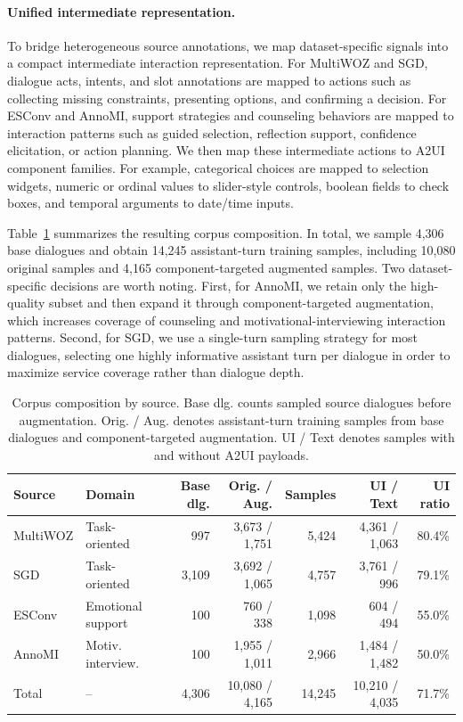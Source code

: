 \paragraph{Unified intermediate representation.}
To bridge heterogeneous source annotations, we map dataset-specific signals into a compact intermediate interaction representation. For MultiWOZ and SGD, dialogue acts, intents, and slot annotations are mapped to actions such as collecting missing constraints, presenting options, and confirming a decision. For ESConv and AnnoMI, support strategies and counseling behaviors are mapped to interaction patterns such as guided selection, reflection support, confidence elicitation, or action planning. We then map these intermediate actions to A2UI component families. For example, categorical choices are mapped to selection widgets, numeric or ordinal values to slider-style controls, boolean fields to check boxes, and temporal arguments to date/time inputs.

Table~\ref{tab:corpus_composition} summarizes the resulting corpus composition. In total,
we sample 4,306 base dialogues and obtain 14,245 assistant-turn training samples, including
10,080 original samples and 4,165 component-targeted augmented samples. Two dataset-specific
decisions are worth noting. First, for AnnoMI, we retain only the high-quality subset and then
expand it through component-targeted augmentation, which increases coverage of counseling
and motivational-interviewing interaction patterns. Second, for SGD, we use a single-turn
sampling strategy for most dialogues, selecting one highly informative assistant turn per
dialogue in order to maximize service coverage rather than dialogue depth.

\begin{table}[t]
\centering
\small
\setlength{\tabcolsep}{4pt}
\begin{tabular}{llrrrrr}
\toprule
Source & Domain & Base dlg. & Orig. / Aug. & Samples & UI / Text & UI ratio \\
\midrule
MultiWOZ & Task-oriented & 997 & 3,673 / 1,751 & 5,424 & 4,361 / 1,063 & 80.4\% \\
SGD & Task-oriented & 3,109 & 3,692 / 1,065 & 4,757 & 3,761 / 996 & 79.1\% \\
ESConv & Emotional support & 100 & 760 / 338 & 1,098 & 604 / 494 & 55.0\% \\
AnnoMI & Motiv. interview. & 100 & 1,955 / 1,011 & 2,966 & 1,484 / 1,482 & 50.0\% \\
\midrule
Total & -- & 4,306 & 10,080 / 4,165 & 14,245 & 10,210 / 4,035 & 71.7\% \\
\bottomrule
\end{tabular}
\caption{
Corpus composition by source. Base dlg. counts sampled source dialogues before augmentation.
Orig. / Aug. denotes assistant-turn training samples from base dialogues and component-targeted augmentation.
UI / Text denotes samples with and without A2UI payloads.
}
\label{tab:corpus_composition}
\end{table}

